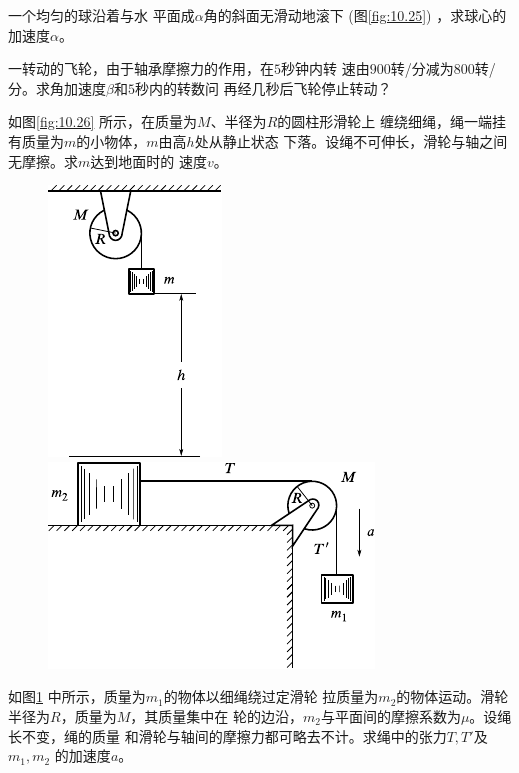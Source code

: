 \begin{exercises}
\exercise 一个均匀的球沿着与水
平面成$ \alpha $角的斜面无滑动地滚下
(图\ref{fig:10.25})  ，求球心的加速度$ \alpha $。

\exercise 一转动的飞轮，由于轴承摩擦力的作用，在$ 5 $秒钟内转
速由$ 900 $转/分减为$ 800 $转/分。求角加速度$ \beta $和$ 5 $秒内的转数问
再经几秒后飞轮停止转动？

\exercise 如图\ref{fig:10.26} 所示，在质量为$ M $、半径为$ R $的圆柱形滑轮上
缠绕细绳，绳一端挂有质量为$ m $的小物体，$ m $由高$ h $处从静止状态
下落。设绳不可伸长，滑轮与轴之间无摩擦。求$ m $达到地面时的
速度$ v $。
\begin{figure}[h]
    \begin{minipage}[b]{0.4\linewidth}
        \centering
        \includegraphics{figure/fig10.26}
        \caption{}
        \label{fig:10.26}
    \end{minipage}
    \begin{minipage}[b]{0.4\linewidth}
        \centering
        \includegraphics{figure/fig10.27}
        \caption{}
        \label{fig:10.27}
    \end{minipage}
\end{figure}

\exercise 如图\ref{fig:10.27} 中所示，质量为$  m _ { 1 }   $的物体以细绳绕过定滑轮
拉质量为$  m _ { 2 }   $的物体运动。滑轮半径为$ R $，质量为$ M $，其质量集中在
轮的边沿，$ m_2 $与平面间的摩擦系数为$ \mu $。设绳长不变，绳的质量
和滑轮与轴间的摩擦力都可略去不计。求绳中的张力$ T, T' $及$ m_1, m_2 $
的加速度$ a $。


\end{exercises}
